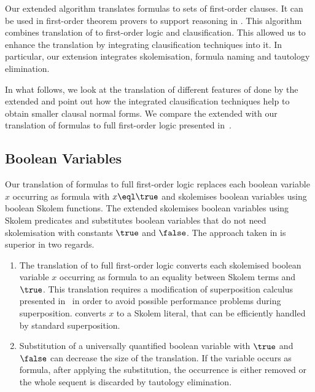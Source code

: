 
Our extended \newcnf{} algorithm translates \folb{} formulas to sets of first-order clauses. It can be used in first-order theorem provers to support reasoning in \folb{}. This algorithm combines translation of \folb{} to first-order logic and clausification. This allowed us to enhance the translation by integrating clausification techniques into it. In particular, our extension integrates skolemisation, formula naming and tautology elimination. 

In what follows, we look at the translation of different features of \folb{} done by the extended \newcnf{} and point out how the integrated clausification techniques help to obtain smaller clausal normal forms. We compare the extended \newcnf{} with our translation of \folb{} formulas to full first-order logic presented in~\cite{FOOL}.

\subsection{Boolean Variables}
Our translation of \folb{} formulas to full first-order logic replaces each boolean variable $x$ occurring as formula with $x \eql \true$ and skolemises boolean variables using boolean Skolem functions. The extended \newcnf{} skolemises boolean variables using Skolem predicates and substitutes boolean variables that do not need skolemisation with constants $\true$ and $\false$. The approach taken in \newcnf{} is superior in two regards.
\begin{enumerate}
  \item The translation of \folb{} to full first-order logic converts each skolemised boolean variable $x$ occurring as formula to an equality between Skolem terms and $\true$. This translation requires a modification of superposition calculus presented in~\cite{FOOL} in order to avoid possible performance problems during superposition. \newcnf{} converts $x$ to a Skolem literal, that can be efficiently handled by standard superposition.  
  \item Substitution of a universally quantified boolean variable with $\true$ and $\false$ can decrease the size of the translation. If the variable occurs as formula, after applying the substitution, the occurrence is either removed or the whole sequent is discarded by tautology elimination.
\end{enumerate}

